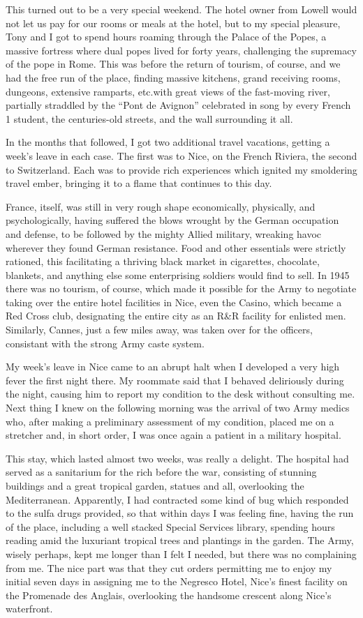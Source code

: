 \documentclass[../m3y]{subfiles}
\begin{document}
This turned out to be a very special weekend. The hotel owner from Lowell would not let us pay for our rooms or meals at the hotel, but to my special pleasure, Tony and I got to spend hours roaming through the Palace of the Popes, a massive fortress where dual popes lived for forty years, challenging the supremacy of the pope in Rome. This was before the return of tourism, of course, and we had the free run of the place, finding massive kitchens, grand receiving rooms, dungeons, extensive ramparts, etc.\@ with great views of the fast-moving river, partially straddled by the ``Pont de Avignon'' celebrated in song by every French 1 student, the centuries-old streets, and the wall surrounding it all.

In the months that followed, I got two additional travel vacations, getting a week's leave in each case. The first was to Nice, on the French Riviera, the second to Switzerland. Each was to provide rich experiences which ignited my smoldering travel ember, bringing it to a flame that continues to this day.

France, itself, was still in very rough shape economically, physically, and psychologically, having suffered the blows wrought by the German occupation and defense, to be followed by the mighty Allied military, wreaking havoc wherever they found German resistance. Food and other essentials were strictly rationed, this facilitating a thriving black market in cigarettes, chocolate, blankets, and anything else some enterprising soldiers would find to sell. In 1945 there was no tourism, of course, which made it possible for the Army to negotiate taking over the entire hotel facilities in Nice, even the Casino, which became a Red Cross club, designating the entire city as an R\&R facility for enlisted men. Similarly, Cannes, just a few miles away, was taken over for the officers, consistant with the strong Army caste system.

My week's leave in Nice came to an abrupt halt when I developed a very high fever the first night there. My roommate said that I behaved deliriously during the night, causing him to report my condition to the desk without consulting me. Next thing I knew on the following morning was the arrival of two Army medics who, after making a preliminary assessment of my condition, placed me on a stretcher and, in short order, I was once again a patient in a military hospital.

This stay, which lasted almost two weeks, was really a delight. The hospital had served as a sanitarium for the rich before the war, consisting of stunning buildings and a great tropical garden, statues and all, overlooking the Mediterranean. Apparently, I had contracted some kind of bug which responded to the sulfa drugs provided, so that within days I was feeling fine, having the run of the place, including a well stacked Special Services library, spending hours reading amid the luxuriant tropical trees and plantings in the garden. The Army, wisely perhaps, kept me longer than I felt I needed, but there was no complaining from me. The nice part was that they cut orders permitting me to enjoy my initial seven days in assigning me to the Negresco Hotel, Nice's finest facility on the Promenade des Anglais, overlooking the handsome crescent along Nice's waterfront.
\end{document}

